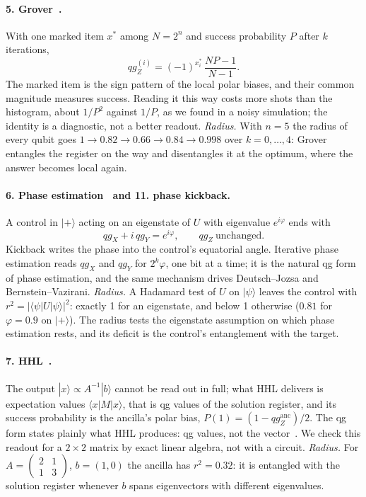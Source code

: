 \documentclass[11pt]{article}
\newcommand{\qZ}{qg_Z}
\newcommand{\qX}{qg_X}
\newcommand{\qY}{qg_Y}
\begin{document}
\paragraph{5. Grover~\cite{grover1996}.} With one marked item $x^\ast$ among $N=2^n$ and success probability $P$
after $k$ iterations,
\begin{equation}\label{eq:grover}
\qZ^{(i)}=(-1)^{x^\ast_i}\,\frac{NP-1}{N-1}.
\end{equation}
The marked item is the sign pattern of the local polar biases, and their common magnitude measures success.
Reading it this way costs more shots than the histogram, about $1/P^2$ against $1/P$, as we found in a noisy
simulation; the identity is a diagnostic, not a better readout. \emph{Radius.} With $n=5$ the radius of every qubit goes
$1\to0.82\to0.66\to0.84\to0.998$ over $k=0,\dots,4$: Grover entangles the register on the way and disentangles it at
the optimum, where the answer becomes local again.

\paragraph{6. Phase estimation~\cite{kitaev1995} and 11. phase kickback.} A control in $|+\rangle$ acting on an
eigenstate of $U$ with eigenvalue $e^{i\varphi}$ ends with
\begin{equation}\label{eq:kick}
\qX+i\,\qY=e^{i\varphi},\qquad \qZ\ \text{unchanged}.
\end{equation}
Kickback writes the phase into the control's equatorial angle. Iterative phase estimation reads $\qX$ and $\qY$
for $2^k\varphi$, one bit at a time; it is the natural qg form of phase estimation, and the same mechanism drives
Deutsch--Jozsa and Bernstein--Vazirani. \emph{Radius.} A Hadamard test of $U$ on $|\psi\rangle$ leaves the control with
$r^2=|\langle\psi|U|\psi\rangle|^2$: exactly 1 for an eigenstate, and below 1 otherwise ($0.81$ for $\varphi=0.9$ on
$|+\rangle$). The radius tests the eigenstate assumption on which phase estimation rests, and its deficit is the
control's entanglement with the target.

\paragraph{7. HHL~\cite{harrow2009}.} The output $|x\rangle\propto A^{-1}|b\rangle$ cannot be read out in full; what
HHL delivers is expectation values $\langle x|M|x\rangle$, that is qg values of the solution register, and its
success probability is the ancilla's polar bias, $P(1)=(1-\qZ^{\mathrm{anc}})/2$. The qg form states plainly
what HHL produces: qg values, not the vector~\cite{aaronson2015}. We check this readout for a $2\times2$ matrix by
exact linear algebra, not with a circuit. \emph{Radius.} For $A=\begin{pmatrix}2&1\\1&3\end{pmatrix}$, $b=(1,0)$ the
ancilla has $r^2=0.32$: it is entangled with the solution register whenever $b$ spans eigenvectors with different
eigenvalues.
\end{document}

